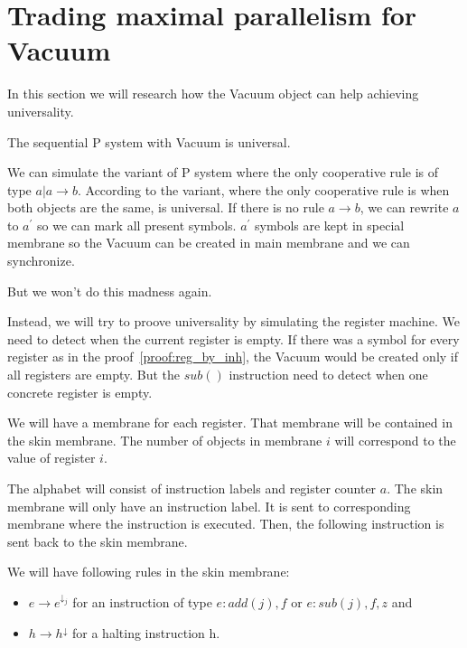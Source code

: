\documentclass[a4paper,10pt]{article}
\begin{document}

\section{Trading maximal parallelism for Vacuum}
\label{sec:vacuum}

In this section we will research how the Vacuum object can help achieving universality.

\begin{veta}
  The sequential P system with Vacuum is universal.
\end{veta}

\begin{dokaz}
  We can simulate the variant of P system where the only cooperative rule is of type $a|a \rightarrow b$. According to \cite{Ibarra04dang:the} the variant, where the only cooperative rule is when both objects are the same, is universal. If there is no rule $a \rightarrow b$, we can rewrite $a$ to $a^{\prime}$ so we can mark all present symbols. $a^{\prime}$ symbols are kept in special membrane so the Vacuum can be created in main membrane and we can synchronize.
  
  But we won't do this madness again.
  
  Instead, we will try to proove universality by simulating the register machine. We need to detect when the current register is empty. If there was a symbol for every register as in the proof~\ref{proof:reg_by_inh}, the Vacuum would be created only if all registers are empty. But the $sub()$ instruction need to detect when one concrete register is empty.
  
  We will have a membrane for each register. That membrane will be contained in the skin membrane. The number of objects in membrane $i$ will correspond to the value of register $i$.
  
  The alphabet will consist of instruction labels and register counter $a$. The skin membrane will only have an instruction label. It is sent to corresponding membrane where the instruction is executed. Then, the following instruction is sent back to the skin membrane.
  
  We will have following rules in the skin membrane:
  
  \begin{itemize}
	\item $e \rightarrow e^{\downarrow_j}$ for an instruction of type $e : add(j), f$ or $e : sub(j), f, z$ and
	\item $h \rightarrow h^{\downarrow}$ for a halting instruction h.
  \end{itemize}
  

\end{dokaz}
\end{document}
